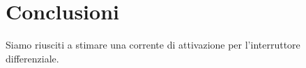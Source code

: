 \section{Conclusioni}
Siamo riusciti a stimare una corrente di attivazione per l'interruttore differenziale. 